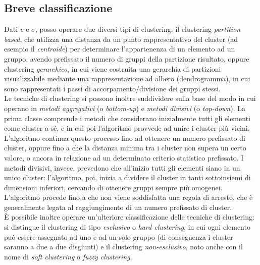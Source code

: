 \documentclass[oneside, openany]{book}
\begin{document}
		\subsection{Breve classificazione}
			Dati $v$ e $\sigma$, posso operare due diversi tipi di clustering: il clustering \textit{partition based}, che utilizza una distanza da un punto rappresentativo del cluster (ad esempio il \textit{centroide}) per determinare l'appartenenza di un elemento ad un gruppo, avendo prefissato il numero di gruppi della partizione risultato, oppure clustering \textit{gerarchico}, in cui viene costruita una gerarchia di partizioni visualizzabile mediante una rappresentazione ad albero (dendrogramma), in cui sono rappresentati i passi di accorpamento/divisione dei gruppi stessi.\\
			Le tecniche di clustering si possono inoltre suddividere sulla base del modo in cui operano in \textit{metodi aggregativi} (o \textit{bottom-up}) e \textit{metodi divisivi} (o \textit{top-down}). La prima classe comprende i metodi che considerano inizialmente tutti gli elementi come cluster a sé, e in cui poi l'algoritmo provvede ad unire i cluster più vicini. L'algoritmo continua questo processo fino ad ottenere un numero prefissato di cluster, oppure fino a che la distanza minima tra i cluster non supera un certo valore, o ancora in relazione ad un determinato criterio statistico prefissato.
			I metodi divisivi, invece, prevedono che all'inizio tutti gli elementi siano in un unico cluster: l'algoritmo, poi, inizia a dividere il cluster in tanti sottoinsiemi di dimensioni inferiori, cercando di ottenere gruppi sempre più omogenei. L'algoritmo procede fino a che non viene soddisfatta una regola di arresto, che è generalmente legata al raggiungimento di un numero prefissato di cluster.\\
			\`E possibile inoltre operare un'ulteriore classificazione delle tecniche di clustering: si distingue il clustering di tipo \textit{esclusivo} o \textit{hard clustering}, in cui ogni elemento può essere assegnato ad uno e ad un solo gruppo (di conseguenza i cluster saranno a due a due disgiunti) e il clustering \textit{non-esclusivo}, noto anche con il nome di \textit{soft clustering} o \textit{fuzzy clustering}.
\end{document}
